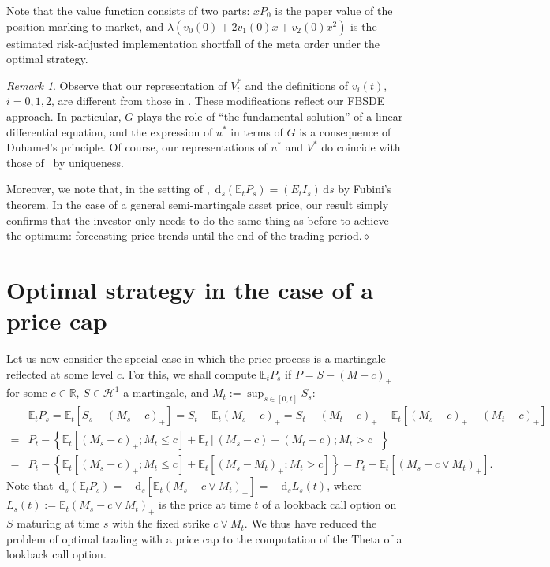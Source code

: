 \documentclass[openany,oneside]{article}
\theoremstyle{definition}
\theoremstyle{remark}
\newtheorem{rem}[thm]{Remark}
\newcommand{\E}{\mathbb{E}} %
\newcommand{\close}{\hspace*{\fill}$\diamond$}
\newcommand{\de}{\,\mathrm{d}}
\begin{document}
Note that the value function consists of two parts: $xP_0$ is the paper value of the position marking to market, and $\lambda(v_0(0)+2v_1(0)x+v_2(0)x^2)$ is the estimated risk-adjusted implementation shortfall of the meta order under the optimal strategy.

\begin{rem}
Observe that our representation of $V^\ast_t$ and the definitions of $v_i(t)$, $i=0,1,2$, are different from those in \cite{lehalle2017incorporating}. These modifications reflect our FBSDE approach. In particular, $G$ plays the role of ``the fundamental solution'' of a linear differential equation, and the expression of $u^\ast$ in terms of $G$ is a consequence of Duhamel's principle. Of course, our representations of $u^\ast$ and $V^\ast$ do coincide with those of~\cite{lehalle2017incorporating} by uniqueness.

Moreover, we note that, in the setting of \cite{lehalle2017incorporating}, $\de_s(\E_t P_s) = (E_t I_s)\de s$ by Fubini's theorem. In the case of a general semi-martingale asset price, our result simply confirms that the investor only needs to do the same thing as before to achieve the optimum: forecasting price trends until the end of the trading period.\close
\end{rem}



\section{Optimal strategy in the case of a price cap}
Let us now consider the special case in which the price process is a martingale reflected at some level $c$. For this, we shall compute $\E_t P_s$ if $P=S-(M-c)_+$ for some $c\in\mathbb{R}$, $S\in\mathcal{H}^1$ a martingale, and $M_t:=\sup_{s\in[0,t]}S_s$:
\begin{align*}
& \E_t P_s = \E_t[S_s-(M_s-c)_+] = S_t-\E_t(M_s-c)_+ = S_t-(M_t-c)_+ - \E_t\left[(M_s-c)_+ - (M_t-c)_+\right] \\
=& P_t -\left\{ \E_t\left[(M_s-c)_+; M_t\le c\right] + \E_t\left[(M_s-c)-(M_t-c); M_t > c\right] \right\} \\
=& P_t -\left\{ \E_t\left[(M_s-c)_+; M_t\le c\right] + \E_t\left[(M_s-M_t)_+; M_t > c\right] \right\} = P_t - \E_t\left[(M_s-c\vee M_t)_+\right].
\end{align*}
Note that $\de_s(\E_t P_s) = -\de_s\left[\E_t(M_s-c\vee M_t)_+\right] = -\de_s L_s(t)$, where $L_s(t):=\E_t(M_s-c\vee M_t)_+$ is the price at time $t$ of a lookback call option on $S$ maturing at time $s$ with the fixed strike $c\vee M_t$. We thus have reduced the problem of optimal trading with a price cap to the computation of the Theta of a lookback call option.
\end{document}
